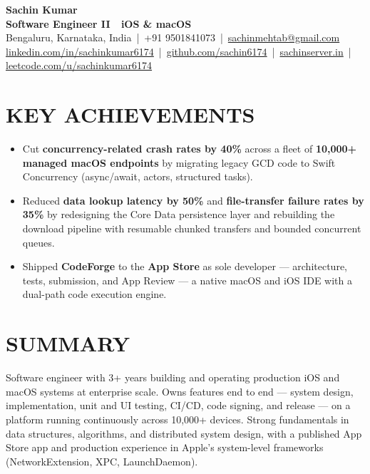 \documentclass[letterpaper,11pt]{article}
\newcommand{\resumeItem}[1]{\item\small{{#1 \vspace{-2pt}}}}
\newcommand{\resumeItemListStart}{\begin{itemize}}
\newcommand{\resumeItemListEnd}{\end{itemize}\vspace{-5pt}}
\begin{document}
\begin{center}
{\Huge \textbf{Sachin Kumar}} \\ \vspace{4pt}
{\large \textbf{Software Engineer II \,\textbar\, iOS \& macOS}} \\ \vspace{5pt}
\small
Bengaluru, Karnataka, India \,|\, +91 9501841073 \,|\,
\href{mailto:sachinmehtab@gmail.com}{sachinmehtab@gmail.com} \\ \vspace{2pt}
\href{https://linkedin.com/in/sachinkumar6174}{linkedin.com/in/sachinkumar6174} \,|\,
\href{https://github.com/sachin6174}{github.com/sachin6174} \,|\,
\href{https://www.sachinserver.in}{sachinserver.in} \,|\,
\href{https://leetcode.com/u/sachinkumar6174/}{leetcode.com/u/sachinkumar6174}
\end{center}

\vspace{-4pt}

\section{KEY ACHIEVEMENTS}
    \vspace{2pt}
    \resumeItemListStart
        \resumeItem{Cut \textbf{concurrency-related crash rates by 40\%} across a fleet of \textbf{10,000+ managed macOS endpoints} by migrating legacy GCD code to Swift Concurrency (async/await, actors, structured tasks).}
        \resumeItem{Reduced \textbf{data lookup latency by 50\%} and \textbf{file-transfer failure rates by 35\%} by redesigning the Core Data persistence layer and rebuilding the download pipeline with resumable chunked transfers and bounded concurrent queues.}
        \resumeItem{Shipped \textbf{CodeForge} to the \textbf{App Store} as sole developer — architecture, tests, submission, and App Review — a native macOS and iOS IDE with a dual-path code execution engine.}
    \resumeItemListEnd

\vspace{-4pt}

\section{SUMMARY}
\vspace{2pt}
\small Software engineer with 3+ years building and operating production iOS and macOS systems at enterprise scale. Owns features end to end — system design, implementation, unit and UI testing, CI/CD, code signing, and release — on a platform running continuously across 10,000+ devices. Strong fundamentals in data structures, algorithms, and distributed system design, with a published App Store app and production experience in Apple's system-level frameworks (NetworkExtension, XPC, LaunchDaemon).
\end{document}
